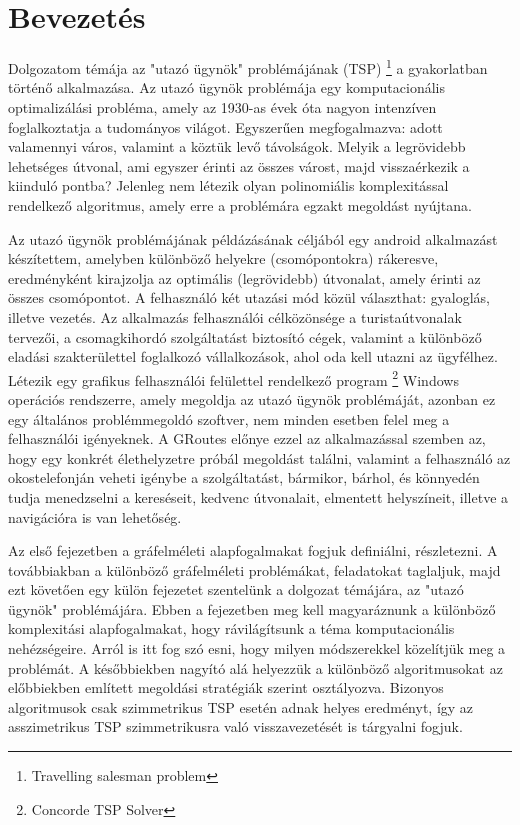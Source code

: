 \chapter{Bevezetés}

Dolgozatom témája az "utazó ügynök" problémájának (TSP)%
\footnote{ %
	Travelling salesman problem
}  %
 a gyakorlatban történő alkalmazása. Az utazó ügynök problémája egy komputacionális optimalizálási probléma, amely az 1930-as évek óta nagyon intenzíven foglalkoztatja a tudományos világot. Egyszerűen megfogalmazva: adott valamennyi város, valamint a köztük levő távolságok. Melyik a legrövidebb lehetséges útvonal, ami egyszer érinti az összes várost, majd visszaérkezik a kiinduló pontba? Jelenleg nem létezik olyan polinomiális komplexitással rendelkező algoritmus, amely erre a problémára egzakt megoldást nyújtana.

Az utazó ügynök problémájának példázásának céljából egy android alkalmazást készítettem, amelyben különböző helyekre (csomópontokra) rákeresve, eredményként kirajzolja az optimális (legrövidebb) útvonalat, amely érinti az összes csomópontot. A felhasználó két utazási mód közül választhat: gyaloglás, illetve vezetés. Az alkalmazás felhasználói célközönsége a turistaútvonalak tervezői, a csomagkihordó szolgáltatást biztosító cégek, valamint a különböző eladási szakterülettel foglalkozó vállalkozások, ahol oda kell utazni az ügyfélhez. Létezik egy grafikus felhasználói felülettel rendelkező program%
\footnote{ %
	Concorde TSP Solver
}  %
 Windows operációs rendszerre, amely megoldja az utazó ügynök problémáját, azonban ez egy általános problémmegoldó szoftver, nem minden esetben felel meg a felhasználói igényeknek. A GRoutes előnye ezzel az alkalmazással szemben az, hogy egy konkrét élethelyzetre próbál megoldást találni, valamint a felhasználó az okostelefonján veheti igénybe a szolgáltatást, bármikor, bárhol, és könnyedén tudja menedzselni a kereséseit, kedvenc útvonalait, elmentett helyszíneit, illetve a navigációra is van lehetőség.

Az első fejezetben a gráfelméleti alapfogalmakat fogjuk definiálni, részletezni. A továbbiakban a különböző gráfelméleti problémákat, feladatokat taglaljuk, majd ezt követően egy külön fejezetet szentelünk a dolgozat témájára, az "utazó ügynök" problémájára. Ebben a fejezetben meg kell magyaráznunk a különböző komplexitási alapfogalmakat, hogy rávilágítsunk a téma komputacionális nehézségeire. Arról is itt fog szó esni, hogy milyen módszerekkel közelítjük meg a problémát. A későbbiekben nagyító alá helyezzük a különböző algoritmusokat az előbbiekben említett megoldási stratégiák szerint osztályozva. Bizonyos algoritmusok csak szimmetrikus TSP esetén adnak helyes eredményt, így az asszimetrikus TSP szimmetrikusra való visszavezetését is tárgyalni fogjuk.

